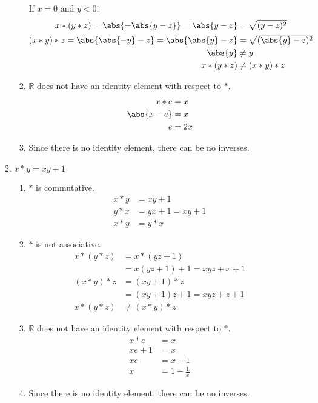 \begin{enumerate}[label={\Alph*.},font={\bfseries}]
\begin{enumerate}[label={\arabic*},font={\bfseries}]
\begin{enumerate}[label={(\roman*)}]
      If $x=0$ and $y<0$:
      \begin{align*}
        x*(y*z) = \abs{-\abs{y-z}} = \abs{y-z} &= \sqrt{(y-z)^2} \\
        (x*y)*z = \abs{\abs{-y}-z} = \abs{\abs{y}-z} &= \sqrt{(\abs{y}-z)^2} \\
        \abs{y} &\neq y \\
        x*(y*z) &\neq (x*y)*z
      \end{align*}
    \item $\mathbb{R}$ does not have an identity element with respect to $*$.
      \begin{align*}
        x*e &= x \\
        \abs{x-e} &= x \\
        e &= 2x
      \end{align*}
    \item Since there is no identity element, there can be no inverses.
    \end{enumerate}
  \item $x*y=xy+1$
    \begin{enumerate}[label={(\roman*)}]
    \item $*$ is commutative.
      \begin{align*}
        x*y &= xy+1 \\
        y*x &= yx+1 = xy+1 \\
        x*y &= y*x
      \end{align*}
    \item $*$ is not associative.
      \begin{align*}
        x*(y*z) &= x*(yz+1) \\
        &= x(yz+1)+1 = xyz+x +1 \\
        (x*y)*z &= (xy+1)*z \\
        &= (xy+1)z+1 = xyz+z+1 \\
        x*(y*z) &\neq (x*y)*z
      \end{align*}
    \item $\mathbb{R}$ does not have an identity element with respect to $*$.
      \begin{align*}
        x*e &= x \\
        xe+1 &= x \\
        xe &= x-1 \\
        x &= 1-\frac{1}{x}
      \end{align*}
    \item Since there is no identity element, there can be no inverses.
    \end{enumerate}

\end{enumerate}
\end{enumerate}
